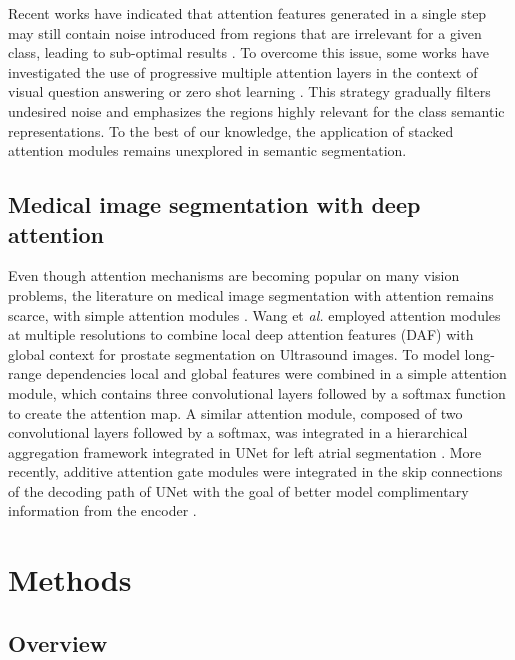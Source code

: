 \documentclass[journal]{IEEEtran}
\begin{document}
Recent works have indicated that attention features generated in a single step may still contain noise introduced from regions that are irrelevant for a given class, leading to sub-optimal results \cite{yang2016stacked,ji2018stacked}. To overcome this issue, some works have investigated the use of progressive multiple attention layers in the context of visual question answering \cite{yang2016stacked} or zero shot learning \cite{ji2018stacked}. This strategy gradually filters undesired noise and emphasizes the regions highly relevant for the class semantic representations. To the best of our knowledge, the application of stacked attention modules remains unexplored in semantic segmentation.

\subsection{Medical image segmentation with deep attention}

Even though attention mechanisms are becoming popular on many vision problems, the literature on medical image segmentation with attention remains scarce, with simple attention modules \cite{wang18d,li2018attention,schlemper2019attention,nie2018asdnet,roy2018concurrent}. Wang et \textit{al.} \cite{wang18d} employed attention modules at multiple resolutions to combine local deep attention features (DAF) with global context for prostate segmentation on Ultrasound images. To model long-range dependencies local and global features were combined in a simple attention module, which contains three convolutional layers followed by a softmax function to create the attention map. A similar attention module, composed of two convolutional layers followed by a softmax, was integrated in a hierarchical aggregation framework integrated in UNet for left atrial segmentation \cite{li2018attention}. More recently, additive attention gate modules were integrated in the skip connections of the decoding path of UNet with the goal of better model complimentary information from the encoder \cite{schlemper2019attention}.

\section{Methods}\label{sec:methods}

\subsection{Overview}
\end{document}
